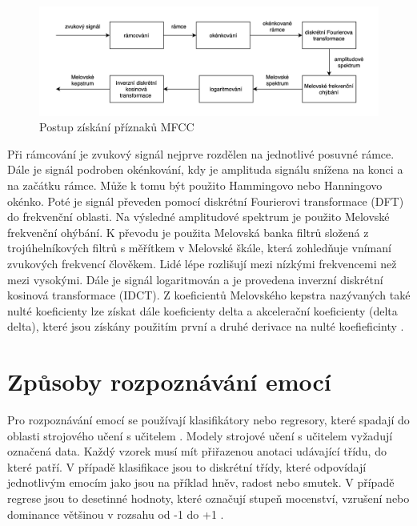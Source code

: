 \documentclass[FM,BP]{tulthesis}
\begin{document}
\begin{figure}[htbp]
\centerline{\includegraphics[width=\textwidth,height=\textheight,keepaspectratio]{mfcc_pipeline.png}}
\caption{Postup získání příznaků MFCC}
\label{fig:mfcc_pipeline}
\end{figure}
\FloatBarrier

Při rámcování je zvukový signál nejprve rozdělen na jednotlivé posuvné rámce. Dále je signál podroben okénkování, kdy je amplituda signálu snížena na konci a na začátku rámce. Může k tomu být použito Hammingovo nebo Hanningovo okénko. Poté je signál převeden pomocí diskrétní Fourierovi transformace (DFT) do frekvenční oblasti. Na výsledné amplitudové spektrum je použito Melovské frekvenční ohýbání. K převodu je použita Melovská banka filtrů složená z trojúhelníkových filtrů s měřítkem v Melovské škále, která zohledňuje vnímaní zvukových frekvencí člověkem. Lidé lépe rozlišují mezi nízkými frekvencemi než mezi vysokými. Dále je signál logaritmován a je provedena inverzní diskrétní kosinová transformace (IDCT). Z koeficientů Melovského kepstra nazývaných také nulté koeficienty lze získat dále koeficienty delta a akcelerační koeficienty (delta delta), které jsou získány použitím první a druhé derivace na nulté koefieficinty \cite{mfcc}.

\section{Způsoby rozpoznávání emocí}  %
Pro rozpoznávání emocí se používají klasifikátory nebo regresory, které spadají do oblasti strojového učení s učitelem \cite{DBLP:journals/speech/AkcayO20}. Modely strojové učení s učitelem vyžadují označená data. Každý vzorek musí mít přiřazenou anotaci udávající třídu, do které patří. V případě klasifikace jsou to diskrétní třídy, které odpovídají jednotlivým emocím jako jsou na příklad hněv, radost nebo smutek. V případě regrese jsou to desetinné hodnoty, které označují stupeň mocenství, vzrušení nebo dominance většinou v rozsahu od -1 do +1 \cite{konar_chakraborty_2015}.
\end{document}
